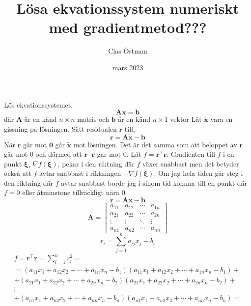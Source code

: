 \documentclass{article}
\title{Lösa ekvationssystem numeriskt med gradientmetod???}
\author{Clas Östman}
\date{mars 2023}
\begin{document}
   \maketitle
   Lös ekvationssystemet,
\begin{equation}
    \mathbf{Ax}=\mathbf{b}
\end{equation}
där $\mathbf{A}$ är en känd $n\times n$ matris och $\mathbf{b}$ är en känd $n\times 1$
vektor
Låt $\mathbf{\tilde{x} }$ vara en gissning på lösningen.
Sätt residualen $\mathbf{r}$ till,
\begin{equation}
    \mathbf{r} = \mathbf{A\tilde{x}} - \mathbf{b}
\end{equation}
När $\mathbf{r}$ går mot $\mathbf{0}$ går  $\mathbf{\tilde{x} }$ mot lösningen.
Det är det samma som att beloppet av $\mathbf{r}$ går mot $0$ och därmed att 
$\mathbf{r}^\intercal\mathbf{r}$
går mot $0$.
Låt $f = \mathbf{r}^\intercal\mathbf{r}$. 
Gradienten till $f$ i en punkt $\boldsymbol{\xi}$, $\nabla f(\boldsymbol{\xi})$, 
pekar i den riktning där $f$ växer snabbast men det betyder också att
$f$ avtar snabbast i riktningen $- \nabla f(\boldsymbol{\xi})$. Om jag hela tiden går 
steg i den riktning där $f$ avtar snabbast borde jag i sinom tid komma till en punkt 
där $f = 0$ eller åtminstone tillräckligt nära $0$.
\begin{equation}
    \mathbf{r} =  \mathbf{Ax} - \mathbf{b}
\end{equation}
\begin{equation}
    \mathbf{A} = \begin{bmatrix}
        a_{11} & a_{12} & \cdots & a_{1n} \\
        a_{21} & a_{22} & \cdots & a_{2n} \\
        \vdots  & \vdots  & \ddots & \vdots  \\
        a_{n1} & a_{n2} & \cdots & a_{nn} 
    \end{bmatrix}      
\end{equation}
\begin{equation}
    r_i =\sum_{j = 1}^{n}  a_{ij}x_j - b_i
\end{equation}
\begin{multline*}
    f = \mathbf{r}^\intercal\mathbf{r} = \sum_{i=1}^{n}  r_i^2 = \\
    = (a_{11}x_1 + a_{12}x_2 + \cdots +a_{1n}x_n  - b_1)(a_{11}x_1 + a_{12}x_2 + \cdots
     +a_{1n}x_n  - b_1)+ \\
    + (a_{21}x_1 + a_{22}x_2 + \cdots +a_{2n}x_n  - b_2)(a_{21}x_1 + a_{22}x_2 + \cdots
     +a_{2n}x_n  - b_2)+ \\
     \vdots \\
    + (a_{n1}x_1 + a_{n2}x_2 + \cdots +a_{nn}x_n  - b_n)(a_{n1}x_1 + a_{n2}x_2 + \cdots
     +a_{nn}x_n  - b_n) =
\end{multline*}
\end{document}
